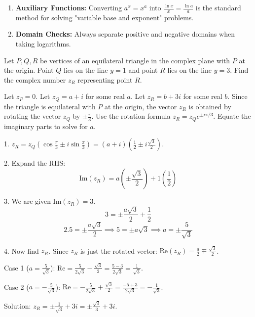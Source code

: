 \begin{takeaways}
\begin{enumerate}
    \item \textbf{Auxiliary Functions:} Converting $a^x = x^a$ into $\frac{\ln x}{x} = \frac{\ln a}{a}$ is the standard method for solving "variable base and exponent" problems.
    \item \textbf{Domain Checks:} Always separate positive and negative domains when taking logarithms.
\end{enumerate}
\end{takeaways}

\begin{problem}
Let $P, Q, R$ be vertices of an equilateral triangle in the complex plane with $P$ at the origin.
Point $Q$ lies on the line $y=1$ and point $R$ lies on the line $y=3$.
Find the complex number $z_R$ representing point $R$.
\end{problem}

\begin{hint}
Let $z_P = 0$.
Let $z_Q = a + i$ for some real $a$.
Let $z_R = b + 3i$ for some real $b$.
Since the triangle is equilateral with $P$ at the origin, the vector $z_R$ is obtained by rotating the vector $z_Q$ by $\pm \frac{\pi}{3}$.
Use the rotation formula $z_R = z_Q e^{\pm i\pi/3}$.
Equate the imaginary parts to solve for $a$.
\end{hint}

\begin{solution}
1. $z_R = z_Q (\cos \frac{\pi}{3} \pm i \sin \frac{\pi}{3}) = (a+i)(\frac{1}{2} \pm i\frac{\sqrt{3}}{2})$.

2. Expand the RHS:
   \[ \text{Im}(z_R) = a(\pm \frac{\sqrt{3}}{2}) + 1(\frac{1}{2}) \]

3. We are given $\text{Im}(z_R) = 3$.
   \[ 3 = \pm \frac{a\sqrt{3}}{2} + \frac{1}{2} \]
   \[ 2.5 = \pm \frac{a\sqrt{3}}{2} \implies 5 = \pm a\sqrt{3} \implies a = \pm \frac{5}{\sqrt{3}} \]

4. Now find $z_R$. Since $z_R$ is just the rotated vector:
   $\text{Re}(z_R) = \frac{a}{2} \mp \frac{\sqrt{3}}{2}$.
   
   Case 1 ($a = \frac{5}{\sqrt{3}}$): $\text{Re} = \frac{5}{2\sqrt{3}} - \frac{\sqrt{3}}{2} = \frac{5 - 3}{2\sqrt{3}} = \frac{1}{\sqrt{3}}$.
   
   Case 2 ($a = -\frac{5}{\sqrt{3}}$): $\text{Re} = -\frac{5}{2\sqrt{3}} + \frac{\sqrt{3}}{2} = \frac{-5 + 3}{2\sqrt{3}} = -\frac{1}{\sqrt{3}}$.
   
   Solution: $z_R = \pm \frac{1}{\sqrt{3}} + 3i = \pm \frac{\sqrt{3}}{3} + 3i$.
\end{solution}

